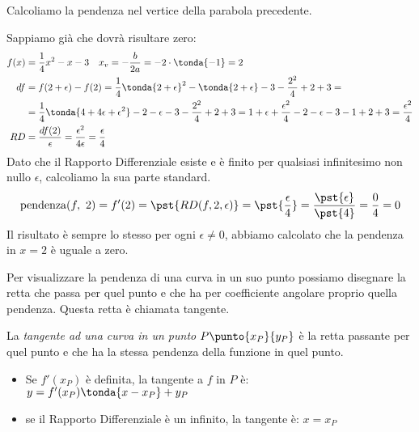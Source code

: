 \begin{esempio}
Calcoliamo la pendenza nel vertice della parabola precedente. 

Sappiamo già che dovrà risultare zero: 
\begin{align*}
f(x) &= \dfrac{1}{4} x^2 -x -3 \quad 
x_v=-\frac{b}{2a}= -2 \cdot \tonda{-1} = 2 \\
df &= f(2+\epsilon) - f(2) =
      \dfrac{1}{4}\tonda{2 +\epsilon}^2  -\tonda{2 +\epsilon} -3 - 
          \frac{2^2}{4}  +2 +3 =\\
&= \dfrac{1}{4}\tonda{4 +4\epsilon +\epsilon^2} -2 -\epsilon -3
    -\frac{2^2}{4} +2 +3 =
    1 +\epsilon +\dfrac{\epsilon^2}{4} -2 -\epsilon -3 -1 +2 +3 =
\frac{\epsilon^2}{4}\\
RD &= 
\dfrac{df(2)}{\epsilon}=\dfrac{\epsilon^2}{4\epsilon}=\dfrac{\epsilon}{4}
  \end{align*}
Dato che il Rapporto Differenziale esiste e è finito per qualsiasi 
infinitesimo non nullo \(\epsilon\), calcoliamo la sua parte standard.
\[\text{pendenza}(f,~2) = f'(2) = 
  \pst{RD(f, 2, \epsilon)} = \pst{\frac{\epsilon}{4}} = 
  \frac{\pst{\epsilon}}{\pst{4}} = \frac{0}{4} = 0\]
Il risultato è sempre lo stesso per ogni \(\epsilon \ne 0\), abbiamo 
calcolato che la pendenza in \(x=2\) è uguale a zero.
\end{esempio}

Per visualizzare la pendenza di una curva in un suo punto 
possiamo disegnare la retta che passa per quel punto e che ha per 
coefficiente angolare proprio quella pendenza. 
Questa retta è chiamata tangente.




\begin{definizione}
\label{def:differenziazione_tangente}
La \emph{tangente ad una curva in un punto} 
\(P\punto{x_P}{y_P}\) 
è la retta passante per quel punto e che ha la stessa pendenza 
della funzione in quel punto. 
\begin{itemize} [nosep]
\item Se \(f'(x_P)\) è definita, la tangente a \(f\) in \(P\) è: \quad 
\(y = f'(x_P)\tonda{x - x_P} +y_P\)
\item se il Rapporto Differenziale è un infinito, la tangente è: \quad 
\(x = x_P\)
\end{itemize}
\end{definizione}

